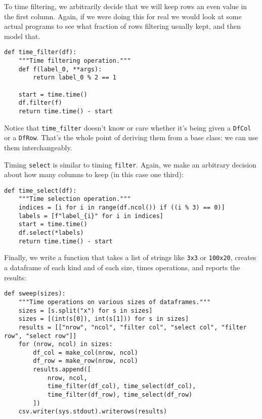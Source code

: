 \documentclass{scrbook}
\begin{document}
To time filtering,
we arbitrarily decide that we will keep rows an even value in the first column.
Again,
if we were doing this for real
we would look at some actual programs
to see what fraction of rows filtering usually kept,
and then model that.


\begin{lstlisting}[frame=single,frameround=tttt]
def time_filter(df):
    """Time filtering operation."""
    def f(label_0, **args):
        return label_0 % 2 == 1

    start = time.time()
    df.filter(f)
    return time.time() - start
\end{lstlisting}



\noindent Notice that \texttt{time\_filter} doesn't know or care
whether it's being given a \texttt{DfCol} or a \texttt{DfRow}.
That's the whole point of deriving them from a base class:
we can use them interchangeably.


Timing \texttt{select} is similar to timing \texttt{filter}.
Again,
we make an arbitrary decision about how many columns to keep
(in this case one third):


\begin{lstlisting}[frame=single,frameround=tttt]
def time_select(df):
    """Time selection operation."""
    indices = [i for i in range(df.ncol()) if ((i % 3) == 0)]
    labels = [f"label_{i}" for i in indices]
    start = time.time()
    df.select(*labels)
    return time.time() - start
\end{lstlisting}



Finally,
we write a function that takes a list of strings like \texttt{3x3} or \texttt{100x20},
creates a dataframe of each kind and of each size,
times operations,
and reports the results:


\begin{lstlisting}[frame=single,frameround=tttt]
def sweep(sizes):
    """Time operations on various sizes of dataframes."""
    sizes = [s.split("x") for s in sizes]
    sizes = [(int(s[0]), int(s[1])) for s in sizes]
    results = [["nrow", "ncol", "filter col", "select col", "filter row", "select row"]]
    for (nrow, ncol) in sizes:
        df_col = make_col(nrow, ncol)
        df_row = make_row(nrow, ncol)
        results.append([
            nrow, ncol,
            time_filter(df_col), time_select(df_col),
            time_filter(df_row), time_select(df_row)
        ])
    csv.writer(sys.stdout).writerows(results)
\end{lstlisting}
\end{document}
